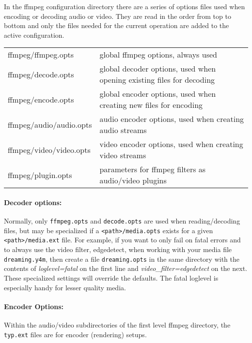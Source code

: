 In the ffmpeg configuration directory there are a series of options files used when encoding or decoding audio or video.  They are read in the order from top to bottom and only the files needed for the current operation are added to the active configuration.

\begin{center}
    \small
    \begin{tabular}{l l}
        \toprule
        ffmpeg/ffmpeg.opts & global ffmpeg options, always used \\
        ffmpeg/decode.opts & global decoder options, used when opening existing files for decoding \\
        ffmpeg/encode.opts & global encoder options, used when creating new files for encoding \\
        ffmpeg/audio/audio.opts & audio encoder options, used when creating audio streams \\
        ffmpeg/video/video.opts & video encoder options, used when creating video streams \\
        ffmpeg/plugin.opts & parameters for ffmpeg filters as audio/video plugins \\
        \bottomrule
    \end{tabular}
\end{center}

\paragraph{Decoder options:} Normally, only \texttt{ffmpeg.opts} and \texttt{decode.opts} are used when reading/decoding files, but may be specialized if a \texttt{<path>/media.opts} exists for a given \texttt{<path>/media.ext} file.  For example, if you want to only fail on fatal errors and to always use the video filter, edgedetect, when working with your media file \texttt{dreaming.y4m}, then create a file \texttt{dreaming.opts} in the same directory with the contents of \textit{loglevel=fatal} on the first line and \textit{video\_filter=edgedetect} on the next.  These specialized settings will override the defaults.  The fatal loglevel is especially handy for lesser quality media.

\paragraph{Encoder Options:} Within the audio/video subdirectories of the first level ffmpeg directory, the \texttt{typ.ext} files are for encoder (rendering) setups.

